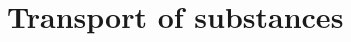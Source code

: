 \def\abs#1{\lvert#1\rvert}
\def\argdot{{\hspace{0.18em}\cdot\hspace{0.18em}}}
\def\D{{\tn D}}
\def\div{\operatorname{div}}
\def\grad{\nabla}
\def\n{\vc n}
\def\vc#1{\mathbf{\boldsymbol{#1}}}     %
\def\R{\mathbb R}
\def\sc#1#2{\left(#1,#2\right)}
\def\th{\vartheta}
\def\Tr{\operatorname{Tr}}
\def\where{\,|\,}


\section{Transport of substances}
\label{sc:transport_model}

